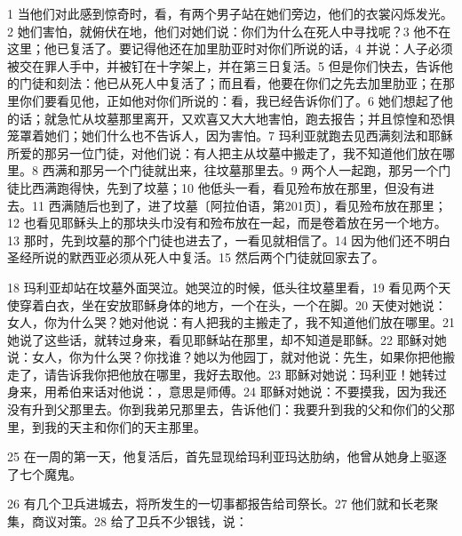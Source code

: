 1  当他们对此感到惊奇时，看，有两个男子站在她们旁边，他们的衣裳闪烁发光。2  她们害怕，就俯伏在地，他们对她们说：你们为什么在死人中寻找呢？3  他不在这里；他已复活了。要记得他还在加里肋亚时对你们所说的话，4  并说：人子必须被交在罪人手中，并被钉在十字架上，并在第三日复活。5  但是你们快去，告诉他的门徒和刻法：他已从死人中复活了；而且看，他要在你们之先去加里肋亚；在那里你们要看见他，正如他对你们所说的：看，我已经告诉你们了。6  她们想起了他的话；就急忙从坟墓那里离开，又欢喜又大大地害怕，跑去报告；并且惊惶和恐惧笼罩着她们；她们什么也不告诉人，因为害怕。7  玛利亚就跑去见西满刻法和耶稣所爱的那另一位门徒，对他们说：有人把主从坟墓中搬走了，我不知道他们放在哪里。8  西满和那另一个门徒就出来，往坟墓那里去。9  两个人一起跑，那另一个门徒比西满跑得快，先到了坟墓；10  他低头一看，看见殓布放在那里，但没有进去。11  西满随后也到了，进了坟墓〔阿拉伯语，第201页〕，看见殓布放在那里；12  也看见耶稣头上的那块头巾没有和殓布放在一起，而是卷着放在另一个地方。13  那时，先到坟墓的那个门徒也进去了，一看见就相信了。14  因为他们还不明白圣经所说的默西亚必须从死人中复活。15  然后两个门徒就回家去了。\par

18  玛利亚却站在坟墓外面哭泣。她哭泣的时候，低头往坟墓里看，19  看见两个天使穿着白衣，坐在安放耶稣身体的地方，一个在头，一个在脚。20  天使对她说：女人，你为什么哭？她对他说：有人把我的主搬走了，我不知道他们放在哪里。21  她说了这些话，就转过身来，看见耶稣站在那里，却不知道是耶稣。22  耶稣对她说：女人，你为什么哭？你找谁？她以为他园丁，就对他说：先生，如果你把他搬走了，请告诉我你把他放在哪里，我好去取他。23  耶稣对她说：玛利亚！她转过身来，用希伯来话对他说：，意思是师傅。24  耶稣对她说：不要摸我，因为我还没有升到父那里去。你到我弟兄那里去，告诉他们：我要升到我的父和你们的父那里，到我的天主和你们的天主那里。\par

25  在一周的第一天，他复活后，首先显现给玛利亚玛达肋纳，他曾从她身上驱逐了七个魔鬼。\par

26  有几个卫兵进城去，将所发生的一切事都报告给司祭长。27  他们就和长老聚集，商议对策。28  给了卫兵不少银钱，说：\par


